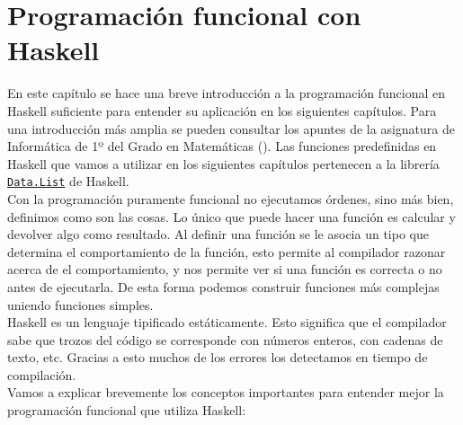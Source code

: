 \chapter{Programación funcional con Haskell}\label{sec:progfunHas}

En este capítulo se hace una breve introducción a la programación funcional en
Haskell suficiente para entender su aplicación en los siguientes
capítulos. Para una introducción más amplia se pueden consultar los apuntes de
la asignatura de Informática de 1º del Grado en Matemáticas
(\cite{Alonso-15b}). Las funciones predefinidas en Haskell que vamos a utilizar en los siguientes capítulos pertenecen a la librería \href{http://hackage.haskell.org/package/base-4.11.1.0/docs/Data-List.html}{\texttt{Data.List}} de Haskell.\\

Con la programación puramente funcional no ejecutamos órdenes, sino más bien, definimos como son las cosas. Lo único que puede hacer una función es calcular y devolver algo como resultado. Al definir una función se le asocia un tipo que determina el comportamiento de la función, esto permite al compilador razonar acerca de el comportamiento, y nos permite ver si una función es correcta o no antes de ejecutarla. De esta forma podemos construir funciones más complejas uniendo funciones simples.\\

Haskell es un lenguaje tipificado estáticamente. Esto significa que el compilador sabe que trozos del código se corresponde con números enteros, con cadenas de texto, etc. Gracias a esto muchos de los errores los detectamos en tiempo de compilación.\\

Vamos a explicar brevemente los conceptos importantes para entender mejor la programación funcional que utiliza Haskell:

